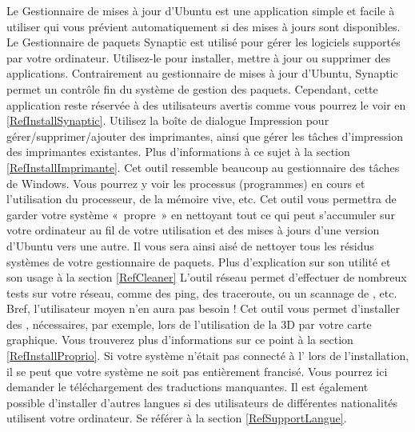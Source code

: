 Le Gestionnaire de mises à jour d'Ubuntu est une application simple et facile à utiliser qui vous prévient automatiquement si des mises à jours sont disponibles.
Le Gestionnaire de paquets Synaptic est utilisé pour gérer les logiciels supportés par votre ordinateur. Utilisez-le pour installer, mettre à jour ou supprimer des applications. Contrairement au gestionnaire de mises à jour d'Ubuntu, Synaptic permet un contrôle fin du système de gestion des paquets. Cependant, cette application reste réservée à des utilisateurs avertis comme vous pourrez le voir en \ref{RefInstallSynaptic}.
Utilisez la boîte de dialogue Impression pour gérer/supprimer/ajouter des imprimantes, ainsi que gérer les tâches d'impression des imprimantes existantes. Plus d'informations à ce sujet à la section \ref{RefInstallImprimante}.
Cet outil ressemble beaucoup au gestionnaire des tâches de Windows. Vous pourrez y voir les processus (programmes) en cours et l'utilisation du processeur, de la mémoire vive, etc.
Cet outil vous permettra de garder votre système «~propre~» en nettoyant tout ce qui peut s'accumuler sur votre ordinateur au fil de votre utilisation et des mises à jours d'une version d'Ubuntu vers une autre. Il vous sera ainsi aisé de nettoyer tous les résidus systèmes de votre gestionnaire de paquets. Plus d'explication sur son utilité et son usage à la section \ref{RefCleaner} 
L'outil réseau permet d'effectuer de nombreux tests sur votre réseau, comme des ping, des traceroute, ou un scannage de , etc. Bref, l'utilisateur moyen n'en aura pas besoin !
Cet outil vous permet d'installer des  , nécessaires, par exemple, lors de l'utilisation de la 3D par votre carte graphique. Vous trouverez plus d'informations sur ce point à la section \ref{RefInstallProprio}.
Si votre système n'était pas connecté à l' lors de l'installation, il se peut que votre système ne soit pas entièrement francisé. Vous pourrez ici demander le téléchargement des traductions manquantes. Il est également possible d'installer d'autres langues si des utilisateurs de différentes nationalités utilisent votre ordinateur. Se référer à la section \ref{RefSupportLangue}.
